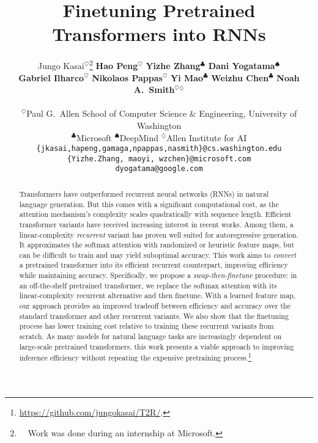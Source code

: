 \documentclass[11pt]{article}
\title{Finetuning Pretrained Transformers into RNNs}
\author{
    Jungo Kasai$^{\heartsuit}$\thanks{\ \ Work was done during an internship at Microsoft.}  
\quad
\quad 
\textbf{Hao Peng}$^{\heartsuit}$
\quad 
\quad 
\textbf{Yizhe Zhang}$^{\clubsuit}$
\quad 
\textbf{Dani Yogatama}$^{\spadesuit}$\\
\textbf{Gabriel Ilharco}$^{\heartsuit}$ 
\quad
\textbf{Nikolaos Pappas}$^{\heartsuit}$ 
\quad 
\textbf{Yi Mao}$^{\clubsuit}$
\quad 
\textbf{Weizhu Chen}$^{\clubsuit}$
\quad
	\textbf{Noah A.\ Smith}$^{\heartsuit\diamondsuit}$\\
\\
    $^{\heartsuit}$Paul G.\ Allen School of Computer Science \& Engineering, University of Washington
    \\
    $^{\clubsuit}$Microsoft
\quad $^{\spadesuit}$DeepMind
\quad $^{\diamondsuit}$Allen Institute for AI\\
    {\tt \{jkasai,hapeng,gamaga,npappas,nasmith\}@cs.washington.edu}\\
    {\tt \{Yizhe.Zhang, maoyi, wzchen\}@microsoft.com}\\
    {\tt dyogatama@google.com}
}
\begin{document}
\setlength{\abovedisplayskip}{4pt}
\setlength{\belowdisplayskip}{4pt}
\setlength{\abovedisplayshortskip}{4pt}
\setlength{\belowdisplayshortskip}{4pt}
\maketitle
\begin{abstract}
Transformers have outperformed recurrent neural networks (RNNs) in natural language generation.
But this comes with a significant computational cost, as the attention mechanism's complexity scales quadratically with sequence length.
Efficient transformer variants have received increasing interest in recent works. 
Among them, a linear-complexity \emph{recurrent} variant has proven well suited for autoregressive generation.
It approximates the softmax attention with randomized or heuristic feature maps,
but can be difficult to train and may yield suboptimal accuracy.
This work aims to \emph{convert} a pretrained transformer into its efficient recurrent counterpart,
improving efficiency while maintaining  accuracy.
Specifically, we propose a \textit{swap-then-finetune} procedure:
in an off-the-shelf pretrained transformer, 
we replace the softmax attention with its linear-complexity recurrent alternative
and then finetune.
With a learned feature map, our approach 
provides an improved tradeoff between efficiency and accuracy over the standard transformer and other recurrent variants.
We also show that the finetuning process has lower training cost relative to training these recurrent variants from scratch.
As many models for natural language tasks are increasingly dependent on large-scale pretrained transformers, this work presents a viable approach to improving inference efficiency without repeating the expensive pretraining process.\footnote{\url{https://github.com/jungokasai/T2R/}.}

\end{abstract}
\end{document}
